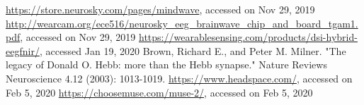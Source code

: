 \documentclass{llncs} %
\begin{document}
\begin{thebibliography}{[MT1]}
    \url{https://store.neurosky.com/pages/mindwave}, accessed on Nov 29, 2019
    \url{http://wearcam.org/ece516/neurosky_eeg_brainwave_chip_and_board_tgam1.pdf}, accessed on Nov 29, 2019
    \url{https://wearablesensing.com/products/dsi-hybrid-eegfnir/}, accessed Jan 19, 2020
    Brown, Richard E., and Peter M. Milner. "The legacy of Donald O. Hebb: more than the Hebb synapse." Nature Reviews Neuroscience 4.12 (2003): 1013-1019.
    \url{https://www.headspace.com/}, accessed on Feb 5, 2020
    \url{https://choosemuse.com/muse-2/}, accessed on Feb 5, 2020
\end{thebibliography}
\end{document}
